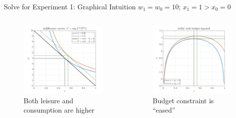 \documentclass[11pt,aspectratio=169,usenames,dvipsnames]{beamer}
\begin{document}
\begin{frame}{Solve for Experiment 1: Graphical Intuition}
\label{slide:Solve_for_Experiment_1__Graphical_Intuition}
    $ w_{1} = w_{0} = 10 $; $ x_{1} = 1 > x_{0} = 0 $
    \begin{columns}
        \begin{column}{0.5\textwidth}
            \begin{figure}
                \caption{Both leisure and consumption are higher}
                \includegraphics[width=.9\textwidth]{./figures/Experiment1IC.png}
            \end{figure}
        \end{column}
        \begin{column}{0.5\textwidth}
            \begin{figure}
                \caption{Budget constraint is ``\alert{eased}''}
                \includegraphics[width=.9\textwidth]{./figures/Experiment1Utility.png}
            \end{figure}
        \end{column}
    \end{columns}
\end{frame}
\end{document}
